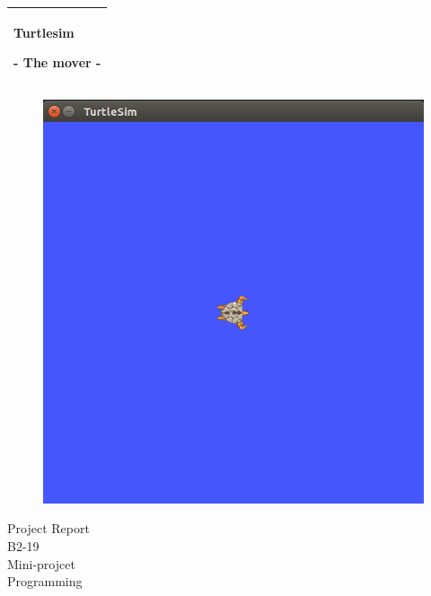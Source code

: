 %
%
%
%
%
\begin{titlepage}
  \addtolength{\hoffset}{0.5\evensidemargin-0.5\oddsidemargin} %
  \noindent%
  \begin{tabular}{@{}p{\textwidth}@{}}
    \toprule[2pt]
    \midrule
    \vspace{0.2cm}
    \begin{center}
    \Huge{\textbf{
      Turtlesim %
    }}
    \end{center}
    \begin{center}
      \Large{
        - The mover -%
      }
    \end{center}
    \vspace{0.2cm}\\
    \midrule
       
    \toprule[2pt]
  \end{tabular}
    \begin{figure}[h]
    \begin{center}
    \includegraphics[width=.5\textwidth]{figures/turtlesim.png}
     \end{center}
    \end{figure}
    
  \vspace{2 cm}
  \begin{center}
    {\large
      Project Report%
    }\\
    \vspace{0.2cm}
    {\Large
      B2-19\\
      Mini-projcet\\
      Programming
    }
  \end{center}
  \vfill
 \end{titlepage}
\clearpage

